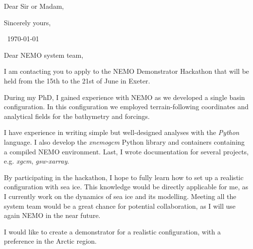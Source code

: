 \documentclass[11pt,a4paper,roman]{moderncv}
\begin{document}


\clearpage

\opening{Dear Sir or Madam,} %
\closing{Sincerely yours,} %

~\hfill \today

\vspace{1.5cm}

Dear NEMO system team,

\vspace{1.5cm}

I am contacting you to apply to the NEMO Demonstrator Hackathon that will be held from the
15th to the 21st of June in Exeter.


\vspace{.5cm}

During my PhD, I gained experience with NEMO
as we developed a single basin configuration.
In this configuration we employed terrain-following coordinates
and analytical fields for the bathymetry and forcings.


\vspace{.5cm}

I have experience in writing simple but well-designed analyses
with the \emph{Python} language. I also develop the \emph{xnemogcm} Python
library and containers containing a compiled NEMO environment.
Last, I wrote documentation for several projects,
e.g. \emph{xgcm}, \emph{gsw-xarray}.



\vspace{.5cm}


By participating in the hackathon, I hope to fully learn how to set
up a realistic configuration with sea ice.
This knowledge would be directly applicable for me,
as I currently work on the dynamics of sea ice and its modelling.
Meeting all the system team would be a great chance for potential collaboration,
as I will use again NEMO in the near future.

\vspace{.5cm}

I would like to create a demonstrator for a realistic configuration,
with a preference in the Arctic region. 
\end{document}
